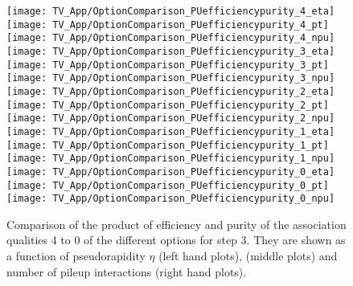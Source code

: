 \begin{figure}[!h]
  \centering
  \texttt{[image: TV\_App/OptionComparison\_PUefficiencypurity\_4\_eta]}
  \texttt{[image: TV\_App/OptionComparison\_PUefficiencypurity\_4\_pt]}
  \texttt{[image: TV\_App/OptionComparison\_PUefficiencypurity\_4\_npu]}
  \\
  \texttt{[image: TV\_App/OptionComparison\_PUefficiencypurity\_3\_eta]}
  \texttt{[image: TV\_App/OptionComparison\_PUefficiencypurity\_3\_pt]}
  \texttt{[image: TV\_App/OptionComparison\_PUefficiencypurity\_3\_npu]}
  \\
  \texttt{[image: TV\_App/OptionComparison\_PUefficiencypurity\_2\_eta]}
  \texttt{[image: TV\_App/OptionComparison\_PUefficiencypurity\_2\_pt]}
  \texttt{[image: TV\_App/OptionComparison\_PUefficiencypurity\_2\_npu]}
  \\
  \texttt{[image: TV\_App/OptionComparison\_PUefficiencypurity\_1\_eta]}
  \texttt{[image: TV\_App/OptionComparison\_PUefficiencypurity\_1\_pt]}
  \texttt{[image: TV\_App/OptionComparison\_PUefficiencypurity\_1\_npu]}
  \\
  \texttt{[image: TV\_App/OptionComparison\_PUefficiencypurity\_0\_eta]}
  \texttt{[image: TV\_App/OptionComparison\_PUefficiencypurity\_0\_pt]}
  \texttt{[image: TV\_App/OptionComparison\_PUefficiencypurity\_0\_npu]}
  \\
\caption[Comparison of the association qualities 4 to 0 of the different options for step 3 of the association map]{Comparison of the product of efficiency and purity of the association qualities 4 to 0 of the different options for step 3. They are shown as a function of pseudorapidity $\eta$ (left hand plots), \pt{} (middle plots) and number of pileup interactions (right hand plots). \label{sec:TrackAss_AppPileup}}
\end{figure}
